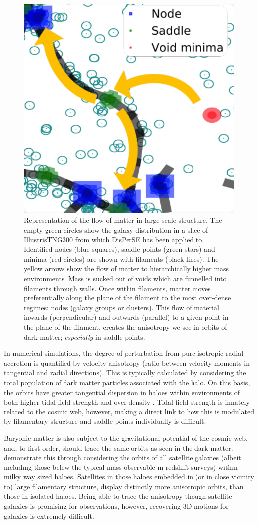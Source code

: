 \begin{figure}
    \centering
	\includegraphics[width=0.5\linewidth]{thesis/latex/dyn_mod_files/disperse_matter_path.pdf}
    \caption{Representation of the flow of matter in large-scale structure. The empty green circles show the galaxy distribution in a slice of IllustrisTNG300 from which DisPerSE has been applied to. Identified nodes (blue squares), saddle points (green stars) and minima (red circles) are shown with filaments (black lines). The yellow arrows show the flow of matter to hierarchically higher mass environments. Mass is sucked out of voids which are funnelled into filaments through walls. Once within filaments, matter moves preferentially along the plane of the filament to the most over-dense regimes: nodes (galaxy groups or clusters). This flow of material inwards (perpendicular) and outwards (parallel) to a given point in the plane of the filament, creates the anisotropy we see in orbits of dark matter; \textit{especially} in saddle points.}
    \label{fig:disperse_matter_path}
\end{figure}

In numerical simulations, the degree of perturbation from pure isotropic radial accretion is quantified by velocity anisotropy (ratio between velocity moments in tangential and radial directions). This is typically calculated by considering the total population of dark matter particles associated with the halo. On this basis, the orbits have greater tangential dispersion in haloes within environments of both higher tidal field strength and over-density \citep[e.g.][]{faltenbacher2010, shi2015}. Tidal field strength is innately related to the cosmic web, however, making a direct link to how this is modulated by filamentary structure and saddle points individually is difficult. 

Baryonic matter is also subject to the gravitational potential of the cosmic web, and, to first order, should trace the same orbits as seen in the dark matter. \citep[][]{garaldi2018} demonstrate this through considering the orbits of all satellite galaxies (albeit including those below the typical mass observable in redshift surveys) within milky way sized haloes. Satellites in those haloes embedded in (or in close vicinity to) large filamentary structure, display distinctly more anisotropic orbits, than those in isolated haloes. Being able to trace the anisotropy though satellite galaxies is promising for observations, however, recovering 3D motions for galaxies is extremely difficult.

